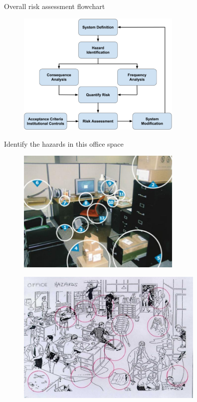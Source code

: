 \documentclass[aspectratio=1610,pdftex,dvipsnames,compress,xcolor={dvipsnames}]{beamer}
\begin{document}
\addtocounter{framenumber}{-1}
\begin{frame}{Overall risk assessment flowchart}
    \begin{figure}
        \centering
        \includegraphics[width=0.70\textwidth]{chart.png}
    \end{figure}
\end{frame}


\begin{frame}{Identify the hazards in this office space}
    \begin{figure}
        \centering
        \includegraphics[width=0.70\textwidth]{office.space.jpg}
    \end{figure}
\end{frame}


\begin{frame}{}
    \begin{figure}
        \centering
        \includegraphics[width=0.80\textwidth]{workplace.jpg}
    \end{figure}
\end{frame}
\end{document}

